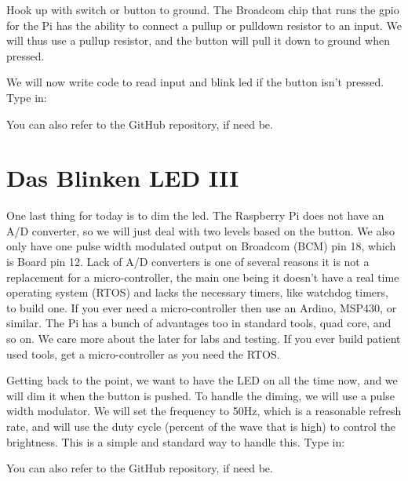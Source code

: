 Hook up with switch or button to ground.  The Broadcom chip that runs the gpio for the Pi has the ability to connect a pullup or pulldown resistor to an input.  We will thus use a pullup resistor, and the button will pull it down to ground when pressed.

We will now write code to read input and blink led if the button isn't pressed.  Type in:


You can also refer to the GitHub repository, if need be.




\section{Das Blinken LED III}

One last thing for today is to dim the led.  The Raspberry Pi does not have an A/D converter, so we will just deal with two levels based on the button.  We also only have one pulse width modulated output on Broadcom (BCM) pin 18, which is Board pin 12.  Lack of A/D converters is one of several reasons it is not a replacement for a micro-controller, the main one being it doesn't have a real time operating system (RTOS) and lacks the necessary timers, like watchdog timers, to build one.  If you ever need a micro-controller then use an Ardino, MSP430, or similar.  The Pi has a bunch of advantages too in standard tools, quad core, and so on.  We care more about the later for labs and testing.  If you ever build patient used tools, get a micro-controller as you need the RTOS.

Getting back to the point, we want to have the LED on all the time now, and we will dim it when the button is pushed.  To handle the diming, we will use a pulse width modulator.  We will set the frequency to 50Hz, which is a reasonable refresh rate, and will use the duty cycle (percent of the wave that is high) to control the brightness.  This is a simple and standard way to handle this.  Type in:


You can also refer to the GitHub repository, if need be.



